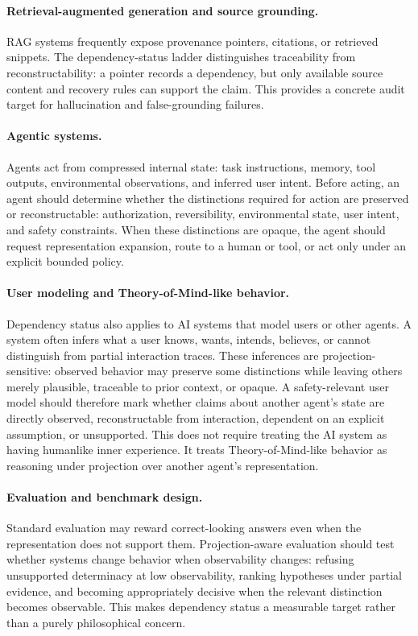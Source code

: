 \documentclass[11pt]{article}
\begin{document}
\paragraph{Retrieval-augmented generation and source grounding.}
RAG systems frequently expose provenance pointers, citations, or retrieved snippets. The dependency-status ladder distinguishes traceability from reconstructability: a pointer records a dependency, but only available source content and recovery rules can support the claim. This provides a concrete audit target for hallucination and false-grounding failures.

\paragraph{Agentic systems.}
Agents act from compressed internal state: task instructions, memory, tool outputs, environmental observations, and inferred user intent. Before acting, an agent should determine whether the distinctions required for action are preserved or reconstructable: authorization, reversibility, environmental state, user intent, and safety constraints. When these distinctions are opaque, the agent should request representation expansion, route to a human or tool, or act only under an explicit bounded policy.

\paragraph{User modeling and Theory-of-Mind-like behavior.}
Dependency status also applies to AI systems that model users or other agents. A system often infers what a user knows, wants, intends, believes, or cannot distinguish from partial interaction traces. These inferences are projection-sensitive: observed behavior may preserve some distinctions while leaving others merely plausible, traceable to prior context, or opaque. A safety-relevant user model should therefore mark whether claims about another agent's state are directly observed, reconstructable from interaction, dependent on an explicit assumption, or unsupported. This does not require treating the AI system as having humanlike inner experience. It treats Theory-of-Mind-like behavior as reasoning under projection over another agent's representation.

\paragraph{Evaluation and benchmark design.}
Standard evaluation may reward correct-looking answers even when the representation does not support them. Projection-aware evaluation should test whether systems change behavior when observability changes: refusing unsupported determinacy at low observability, ranking hypotheses under partial evidence, and becoming appropriately decisive when the relevant distinction becomes observable. This makes dependency status a measurable target rather than a purely philosophical concern.
\end{document}
